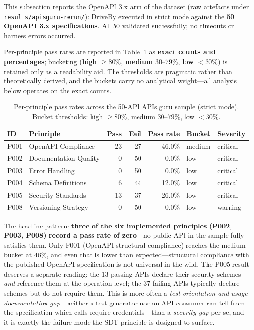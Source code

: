 This subsection reports the OpenAPI 3.x arm of the dataset (raw artefacts under \texttt{results/apisguru-rerun/}): DriveBy executed in strict mode against the \textbf{50 OpenAPI 3.x specifications}. All 50 validated successfully; no timeouts or harness errors occurred.

Per-principle pass rates are reported in Table~\ref{tab:pass-rates} as \textbf{exact counts and percentages}; bucketing (\textbf{high} $\geq 80\%$, \textbf{medium} $30$--$79\%$, \textbf{low} $< 30\%$) is retained only as a readability aid. The thresholds are pragmatic rather than theoretically derived, and the buckets carry no analytical weight---all analysis below operates on the exact counts.

\begin{table}[htbp]
\centering
\caption{Per-principle pass rates across the 50-API APIs.guru sample (strict mode). Bucket thresholds: high $\geq 80\%$, medium $30$--$79\%$, low $< 30\%$.}
\label{tab:pass-rates}
\small
\begin{tabular}{@{}llrrrll@{}}
\toprule
\textbf{ID} & \textbf{Principle} & \textbf{Pass} & \textbf{Fail} & \textbf{Pass rate} & \textbf{Bucket} & \textbf{Severity} \\
\midrule
P001 & OpenAPI Compliance     & 23 & 27 & 46.0\% & medium & critical \\
P002 & Documentation Quality  &  0 & 50 &  0.0\% & low    & critical \\
P003 & Error Handling         &  0 & 50 &  0.0\% & low    & critical \\
P004 & Schema Definitions     &  6 & 44 & 12.0\% & low    & critical \\
P005 & Security Standards     & 13 & 37 & 26.0\% & low    & critical \\
P008 & Versioning Strategy    &  0 & 50 &  0.0\% & low    & warning  \\
\bottomrule
\end{tabular}
\end{table}

The headline pattern: \textbf{three of the six implemented principles (P002, P003, P008) record a pass rate of zero}---no public API in the sample fully satisfies them. Only P001 (OpenAPI structural compliance) reaches the medium bucket at 46\%, and even that is lower than expected---structural compliance with the published OpenAPI specification is not universal in the wild. The P005 result deserves a separate reading: the 13 passing APIs declare their security schemes \emph{and} reference them at the operation level; the 37 failing APIs typically declare schemes but do not require them. This is more often a \emph{test-orientation and usage-documentation gap}---neither a test generator nor an API consumer can tell from the specification which calls require credentials---than a \emph{security gap} per se, and it is exactly the failure mode the SDT principle is designed to surface.

